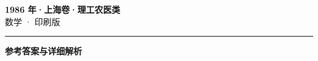 \documentclass[zihao=5, a4paper]{ctexart}
\begin{document}
\begin{center}
  {\Large\bfseries 1986 年·上海卷·理工农医类}\\[4pt]
  {\large 数学 · 印刷版}
\end{center}
\medskip
{}

\par\bigskip\hrule\bigskip
{}
\begin{center}{\large\bfseries 参考答案与详细解析}\end{center}
\smallskip

\end{document}
